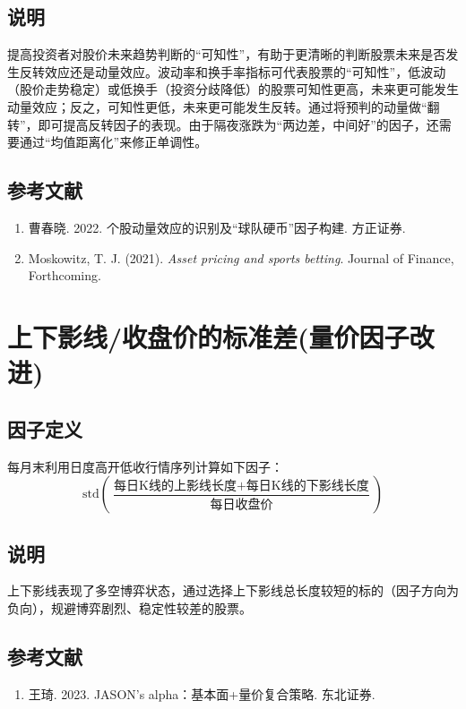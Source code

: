 \documentclass{article}
\begin{document}
\subsection{说明}
提高投资者对股价未来趋势判断的“可知性”，有助于更清晰的判断股票未来是否发生反转效应还是动量效应。波动率和换手率指标可代表股票的“可知性”，低波动（股价走势稳定）或低换手（投资分歧降低）的股票可知性更高，未来更可能发生动量效应；反之，可知性更低，未来更可能发生反转。通过将预判的动量做“翻转”，即可提高反转因子的表现。由于隔夜涨跌为“两边差，中间好”的因子，还需要通过“均值距离化”来修正单调性。

\subsection{参考文献}
\begin{enumerate}
    \item 曹春晓. 2022. 个股动量效应的识别及“球队硬币”因子构建. 方正证券.
    \item Moskowitz, T. J. (2021). \textit{Asset pricing and sports betting}. Journal of Finance, Forthcoming.
\end{enumerate}

\section{上下影线/收盘价的标准差(量价因子改进)}

\subsection{因子定义}

每月末利用日度高开低收行情序列计算如下因子：
\begin{equation}
    \mathrm{std}\left( \frac{\text{每日K线的上影线长度} + \text{每日K线的下影线长度}}{\text{每日收盘价}} \right)
\end{equation}

\subsection{说明}
上下影线表现了多空博弈状态，通过选择上下影线总长度较短的标的（因子方向为负向），规避博弈剧烈、稳定性较差的股票。

\subsection{参考文献}
\begin{enumerate}
    \item 王琦. 2023. JASON's alpha：基本面+量价复合策略. 东北证券.
\end{enumerate}
\end{document}
